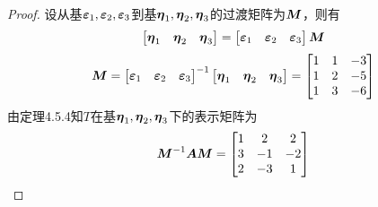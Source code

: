 \begin{proof}
    设从基\(\boldsymbol{\varepsilon}_1,\boldsymbol{\varepsilon}_2,\boldsymbol{\varepsilon}_3\)到基\(\boldsymbol{\eta}_1,\boldsymbol{\eta}_2,\boldsymbol{\eta}_3\)的过渡矩阵为\(\boldsymbol{M}\)，则有
    \begin{equation*}
        \begin{bmatrix}\boldsymbol{\eta}_1&\boldsymbol{\eta}_2&\boldsymbol{\eta}_3\end{bmatrix}=
        \begin{bmatrix}\boldsymbol{\varepsilon}_1&\boldsymbol{\varepsilon}_2&\boldsymbol{\varepsilon}_3\end{bmatrix}\boldsymbol{M}
    \end{equation*}
    \begin{equation*}
        \boldsymbol{M}={\begin{bmatrix}\boldsymbol{\varepsilon}_1&\boldsymbol{\varepsilon}_2&\boldsymbol{\varepsilon}_3\end{bmatrix}}^{-1}\begin{bmatrix}\boldsymbol{\eta}_1&\boldsymbol{\eta}_2&\boldsymbol{\eta}_3\end{bmatrix}=
        \begin{bmatrix}
            1 & 1 & -3 \\
            1 & 2 & -5 \\
            1 & 3 & -6
        \end{bmatrix}
    \end{equation*}
    由定理4.5.4知\(T\)在基\(\boldsymbol{\eta}_1,\boldsymbol{\eta}_2,\boldsymbol{\eta}_3\)下的表示矩阵为
    \begin{equation*}
        {\boldsymbol{M}}^{-1}\boldsymbol{A}\boldsymbol{M}=
        \begin{bmatrix}
            1 & 2  & 2  \\
            3 & -1 & -2 \\
            2 & -3 & 1
        \end{bmatrix}
    \end{equation*}
\end{proof}

